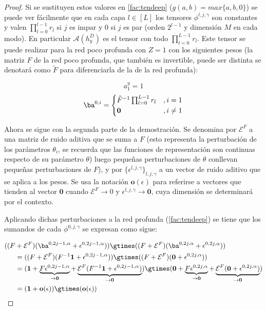 \begin{proof}
Si se sustituyen estos valores en \ref{fac:tendeep} ($g(a,b)=\textit{max}\{a,b,0\}$) se puede ver fácilmente que en cada capa $l\in [L]$ los tensores $\phi^{l,j,\gamma}$ son constantes y valen $\prod_{l=0}^{l-1}r_l$ si $j$ es impar y $0$ si $j$ es par (orden $2^{l-1}$ y dimensión $M$ en cada modo). En particular $\mathcal{A}(h_y^D)$ es el tensor con todo $\prod_{l=0}^{L-1}r_l$. Este tensor se puede realizar para la red poco profunda con $Z=1$ con los siguientes pesos (la matriz $F$ de la red poco profunda, que también es invertible, puede ser distinta se denotará como $\tilde{F}$ para diferenciarla de la de la red profunda):

$$
a_1^y=1
$$
$$
\ba^{0,i} = \begin{cases}
\tilde{F}^{-1}\prod_{l=0}^{L-1}r_l &, i=1\\
\mathbf{0} &, i\neq 1
\end{cases}
$$

Ahora se sigue con la segunda parte de la demostración. Se denomina por $\mathcal{E}^F$ a una matriz de ruido aditiva que se suma a $F$ (esto representa la perturbación de los parámetros $\theta_i$, se recuerda que las funciones de representación son continuas respecto de su parámetro $\theta$) luego pequeñas perturbaciones de $\theta$ conllevan pequeñas perturbaciones de $F$), y por $\{\mathbb{\epsilon}^{l,j,\gamma}\}_{l,j,\gamma}$ a un vector de ruido aditivo que se aplica a los pesos. Se usa la notación $\textbf{o}(\epsilon)$ para referirse a vectores que tienden al vector $\mathbf{0}$ cuando $\mathcal{E}^F \rightarrow 0$ y $\epsilon^{l,j,\gamma} \rightarrow \mathbf{0}$, cuya dimensión se determinará por el contexto.

Aplicando dichas perturbaciones a la red profunda (\ref{fac:tendeep}) se tiene que los sumandos de cada $\phi^{0,j,\gamma}$ se expresan como sigue:


\begin{align*}
((F &+ \mathcal{E}^F)(\ba^{0,2j-1,\alpha}+\epsilon^{0,2j-1,\alpha})) \gtimes ((F + \mathcal{E}^F)(\ba^{0,2j,\alpha}+\epsilon^{0,2j,\alpha})) \\
&= ((F + \mathcal{E}^F)(F^{-1}\mathbf{1}+\epsilon^{0,2j-1,\alpha})) \gtimes ((F + \mathcal{E}^F)(\mathbf{0}+\epsilon^{0,2j,\alpha})) \\
&= (\mathbf{1}+ \underbrace{F\epsilon^{0,2j-1,\alpha}}_{\rightarrow \mathbf{0}} + \underbrace{\mathcal{E}^F(F^{-1}\mathbf{1}+\epsilon^{0,2j-1,\alpha})}_{\rightarrow \mathbf{0}}) \gtimes (\mathbf{0} + \underbrace{F\epsilon^{0,2j,\alpha}}_{\rightarrow \mathbf{0}} + \underbrace{\mathcal{E}^F(\mathbf{0}+\epsilon^{0,2j,\alpha})}_{\rightarrow \mathbf{0}}) \\
&= (\mathbf{1} + \textbf{o}(\epsilon))\gtimes(\textbf{o}(\epsilon))
\end{align*}


\end{proof}
